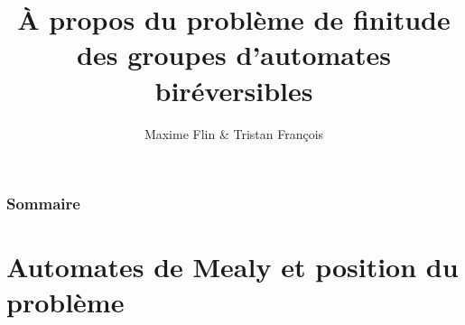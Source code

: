 \documentclass[11pt]{beamer}
\begin{document}
\author{Maxime Flin  \& Tristan François}
\title{\`A propos du problème de finitude des groupes d'automates biréversibles}
\begin{frame}[plain]
  \maketitle
\end{frame}

\begin{frame}
  \frametitle{Sommaire}
  \tableofcontents
\end{frame}

\section{Automates de Mealy et position du problème}
\end{document}
